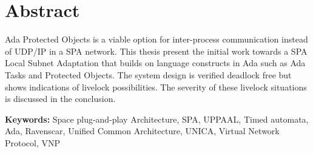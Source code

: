 \chapter*{Abstract}
\thispagestyle{empty} %
Ada Protected Objects is a viable option for inter-process communication
instead of UDP/IP in a SPA network. This thesis present the initial work
towards a SPA Local Subnet Adaptation that builds on language constructs in Ada
such as Ada Tasks and Protected Objects. The system design is verified deadlock
free but shows indications of livelock possibilities. The severity of these
livelock situations is discussed in the conclusion.

\textbf{Keywords:} Space plug-and-play Architecture, SPA, UPPAAL, Timed
automata, Ada, Ravenscar, Unified Common Architecture, UNICA, Virtual Network
Protocol, VNP
